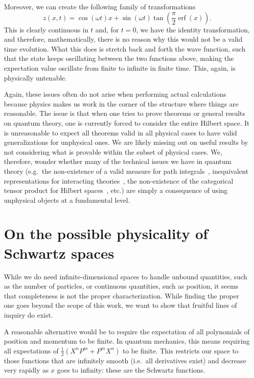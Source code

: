 \documentclass[10pt,twocolumn, nofootinbib]{revtex4-2}
\DeclareMathOperator{\erf}{erf}
\begin{document}
Moreover, we can create the following family of transformations
\begin{equation}
z(x, t) = \cos(\omega t) x + \sin(\omega t) \tan \left(\frac{\pi}{2}\erf(x)\right).
\end{equation}
This is clearly continuous in $t$ and, for $t=0$, we have the identity transformation, and therefore, mathematically, there is no reason why this would not be a valid time evolution. What this does is stretch back and forth the wave function, such that the state keeps oscillating between the two functions above, making the expectation value oscillate from finite to infinite in finite time. This, again, is physically untenable.

Again, these issues often do not arise when performing actual calculations because physics makes us work in the corner of the structure where things are reasonable. The issue is that when one tries to prove theorems or general results on quantum theory, one is currently forced to consider the entire Hilbert space. It is unreasonable to expect all theorems valid in all physical cases to have valid generalizations for unphysical ones. We are likely missing out on useful results by not considering what is provable within the subset of physical cases. We, therefore, wonder whether many of the technical issues we have in quantum theory (e.g.~the non-existence of a valid measure for path integrals~\cite{glimm_quantum_1987}, inequivalent representations for interacting theories~\cite{earman_haags_2006}, the non-existence of the categorical tensor product for Hilbert spaces~\cite{garrett_tensor_2010, sorkin_inside_2022}, etc.)  are simply a consequence of using unphysical objects at a fundamental level.

\section{On the possible physicality of Schwartz spaces}

While we do need infinite-dimensional spaces to handle unbound quantities, such as the number of particles, or continuous quantities, such as position, it seems that completeness is not the proper characterization. While finding the proper one goes beyond the scope of this work, we want to show that fruitful lines of inquiry do exist.

A reasonable alternative would be to require the expectation of all polynomials of position and momentum to be finite. In quantum mechanics, this means requiring all expectations of $\frac{1}{2}(X^nP^m + P^mX^n)$ to be finite. This restricts our space to those functions that are infinitely smooth (i.e.~all derivatives exist) and decrease very rapidly as $x$ goes to infinity: these are the Schwartz functions.
\end{document}
